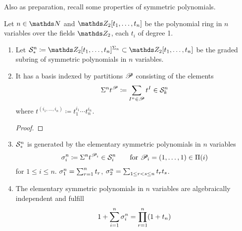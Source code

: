 Also as preparation, recall some properties of symmetric polynomials.
\begin{LemDef}
  Let $n\in\Nat$ and $\Zmod2[t_1,\dotsc,t_n]$ be the polynomial ring
  in $n$ variables over the fields $\Zmod2$, each $t_i$ of degree 1.
  \begin{enumerate}
  \item Let
    $\Symm{n}_*
    \coloneqq \Zmod2[t_1,\dotsc,t_n]^{\Permutations{n}}
    \subset \Zmod2[t_1,\dotsc,t_n]$
    be the graded subring of symmetric polynomials in $n$ variables.
  \item It has a basis indexed by partitions $\mathscr{P}$ consisting of the
    elements
    \begin{gather*}
      \Sigma^{n} t^{\mathscr{P}} \coloneqq \sum_{I^n\in\mathscr{P}} t^I \in \mathcal{S}^{n}_k
    \end{gather*}
    where $t^{(i_1,\dotsc,i_n)}\coloneqq t_1^{i_1}\dotsm t_n^{i_n}$.
    \begin{proof}
    \end{proof}
  \item $\mathcal{S}^{n}_*$ is generated by the
    elementary symmetric polynomials in $n$ variables
    \begin{gather*}
      \sigma_{i}^{n}\coloneqq \Sigma^{n} t^{\mathscr{P}_i}
      \in \mathcal{S}^{n}_i
      \qquad \text{for }
      \mathscr{P}_i = (1,\dotsc,1)
      \in \Pi({i})
    \end{gather*}
    for $1\leq i\leq n$.
    \Forexample
    $\sigma_{1}^{n}=\sum_{r=1}^{n}t_r$,
    $\sigma_{2}^{n}=\sum_{1\leq r<s\leq n} t_r t_s$.
  \item The elementary symmetric polynomials in $n$ variables are
    algebraically independent and fulfill
    \begin{gather}\label{eq:sumelemsymmpoly}
      1 + \sum_{i=1}^{n} \sigma_{i}^{n}
      = \prod_{r=1}^{n}(1+t_n)
    \end{gather}
  \end{enumerate}
\end{LemDef}

